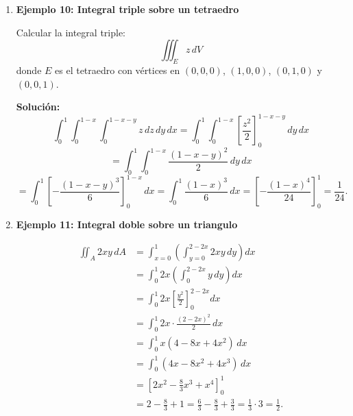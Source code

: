 \documentclass[11pt]{book}
\theoremstyle{definicion}
\theoremstyle{teorema}
\theoremstyle{ejemplo}
\begin{document}
\begin{enumerate}

\item \textbf{Ejemplo 10: Integral triple sobre un tetraedro}

Calcular la integral triple:
\[
\iiint_E z \, dV
\]
donde \( E \) es el tetraedro con vértices en \( (0,0,0) \), \( (1,0,0) \), \( (0,1,0) \) y \( (0,0,1) \).

\textbf{Solución:}
\[
\int_{0}^{1} \int_{0}^{1-x} \int_{0}^{1-x-y} z \, dz \, dy \, dx = \int_{0}^{1} \int_{0}^{1-x} \left[ \frac{z^2}{2} \right]_{0}^{1-x-y} \, dy \, dx 
\]
\[
= \int_{0}^{1} \int_{0}^{1-x} \frac{(1-x-y)^2}{2} \, dy \, dx
\]
\[
= \int_{0}^{1} \left[ -\frac{(1-x-y)^3}{6} \right]_{0}^{1-x} \, dx = \int_{0}^{1} \frac{(1-x)^3}{6} \, dx = \left[ -\frac{(1-x)^4}{24} \right]_{0}^{1} = \frac{1}{24}.
\]

\item \textbf{Ejemplo 11: Integral doble sobre un triangulo}

\[
\begin{aligned}
\iint_A 2xy \, dA &= \int_{x=0}^{1} \left( \int_{y=0}^{2-2x} 2xy \, dy \right) dx \\
&= \int_{0}^{1} 2x \left( \int_{0}^{2-2x} y \, dy \right) dx \\
&= \int_{0}^{1} 2x \left[ \frac{y^2}{2} \right]_{0}^{2-2x} dx \\
&= \int_{0}^{1} 2x \cdot \frac{(2-2x)^2}{2} \, dx \\
&= \int_{0}^{1} x (4 - 8x + 4x^2) \, dx \\
&= \int_{0}^{1} (4x - 8x^2 + 4x^3) \, dx \\
&= \left[ 2x^2 - \frac{8}{3}x^3 + x^4 \right]_{0}^{1} \\
&= 2 - \frac{8}{3} + 1 = \frac{6}{3} - \frac{8}{3} + \frac{3}{3} = \frac{1}{3} \cdot 3 = \boxed{\frac{1}{2}}.
\end{aligned}
\]


\end{enumerate}
\end{document}
